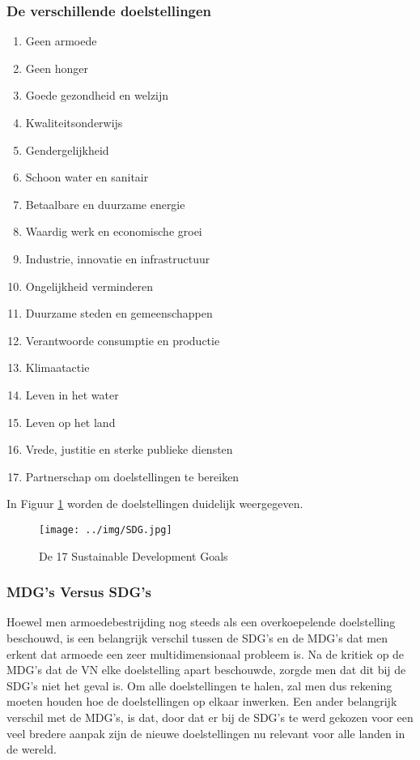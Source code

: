  \subsubsection{De verschillende doelstellingen}
 \begin{enumerate}
 	\item Geen armoede
 		\item Geen honger
 		\item Goede gezondheid en welzijn
 		\item Kwaliteitsonderwijs
 		\item Gendergelijkheid
 		\item Schoon water en sanitair
 		\item Betaalbare en duurzame energie
 		\item Waardig werk en economische groei
 		\item Industrie, innovatie en infrastructuur
 		\item Ongelijkheid verminderen
 		\item Duurzame steden en gemeenschappen
 		\item Verantwoorde consumptie en productie
 		\item Klimaatactie
 		\item Leven in het water
 		\item Leven op het land
 		\item Vrede, justitie en sterke publieke diensten
 		\item Partnerschap om doelstellingen te bereiken
 \end{enumerate}
\autocite{VerenigdeNaties2004}

In Figuur \ref{SDGs} worden de doelstellingen duidelijk weergegeven.
 
 \begin{figure}[h!]
 	\texttt{[image: ../img/SDG.jpg]}
 	\caption{De 17 Sustainable Development Goals \autocite{VerenigdeNaties2004}}
 	\label{SDGs}
 \end{figure}

\subsubsection{MDG's Versus SDG's}
Hoewel men armoedebestrijding nog steeds als een overkoepelende doelstelling beschouwd, is een belangrijk verschil tussen de SDG's en de  MDG's dat men erkent dat armoede een zeer multidimensionaal probleem is. Na de kritiek op de MDG's dat de VN elke doelstelling apart beschouwde, zorgde men dat dit bij de SDG's niet het geval is. Om alle doelstellingen te halen, zal men dus rekening moeten houden hoe de doelstellingen op elkaar inwerken. Een ander belangrijk verschil met de MDG's, is dat, door dat er bij de SDG's te werd gekozen voor een veel bredere aanpak zijn de nieuwe doelstellingen nu relevant voor alle landen in de wereld. \autocite{VN2015}

